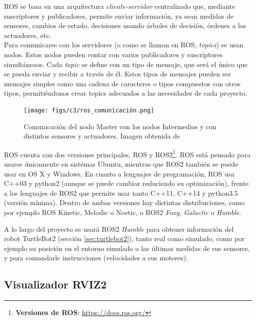 ROS se basa en una arquitectura \textit{cliente-servidor} centralizado que, mediante suscriptores y publicadores, permite enviar información,
ya sean medidas de sensores, cambios de estado, decisiones usando árboles de decisión, órdenes a los actuadores, etc.\\

Para comunicarse con los servidores (o como se llaman en ROS, \textit{topics}) se usan nodos. Estos nodos pueden contar con varios publicadores y suscriptores
simultáneaos.
Cada \textit{topic} se define con un tipo de mensaje, que será el único que se pueda enviar y recibir a través de él. Estos tipos de mensajes pueden ser
mensajes simples como una cadena de caracteres o tipos compuestos con otros tipos, permitiéndonos crear topics adecuados a las necesidades de cada proyecto.

\begin{figure} [H]
    \begin{center}
        \texttt{[image: figs/c3/ros\_comunicación.png]}
    \end{center}
    \caption[Comunicación entre nodos ROS.]{Comunicación del nodo Master con los nodos Intermedios y con distintos sensores y actuadores. Imagen obtenida de \cite{comunicacion_ros2}}
    \label{fig:ros_master_comunicacion}
\end{figure}
ROS cuenta con dos versiones principales, ROS y ROS2\footnote{\textbf{Versiones de ROS}: \url{https://docs.ros.org/}}. ROS está pensado para usarse
únicamente en sistemas Ubuntu, mientras que ROS2 también se puede usar en OS X y Windows. En cuanto a lenguajes de programación, ROS usa C++03 y
python2 (aunque se puede cambiar reduciendo su optimización), frente a los lenguajes de ROS2 que permite usar tanto C++11, C++14 y python3.5 (versión mínima).
Dentro de ambas versiones hay distintas distribuciones, como por ejemplo ROS Kinetic, Melodic o Noetic, o ROS2 \textit{Foxy}, \textit{Galactic} o \textit{Humble}.

A lo largo del proyecto se usará ROS2 \textit{Humble} para obtener información del robot TurtleBot2 (sección \ref{sec:turtlebot2}), tanto real como simulado,
como por ejemplo su posición en el entorno simulado o las últimas medidas de sus sensores, y para comandarle instrucciones (velocidades a sus motores).

\subsection{Visualizador RVIZ2}
\label{subsec:rviz2}

